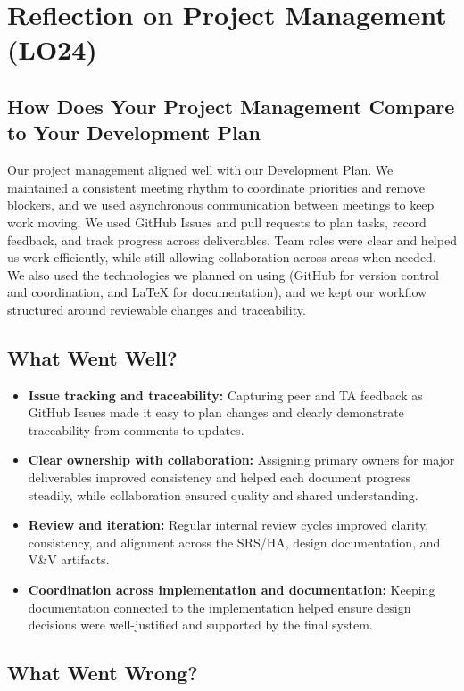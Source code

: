 \documentclass{article}
\begin{document}
\section{Reflection on Project Management (LO24)}

\subsection{How Does Your Project Management Compare to Your Development Plan}

Our project management aligned well with our Development Plan. We maintained a
consistent meeting rhythm to coordinate priorities and remove blockers, and we
used asynchronous communication between meetings to keep work moving. We used
GitHub Issues and pull requests to plan tasks, record feedback, and track progress
across deliverables. Team roles were clear and helped us work efficiently, while
still allowing collaboration across areas when needed. We also used the
technologies we planned on using (GitHub for version control and coordination,
and LaTeX for documentation), and we kept our workflow structured around
reviewable changes and traceability.

\subsection{What Went Well?}

\begin{itemize}
  \item \textbf{Issue tracking and traceability:} Capturing peer and TA feedback
  as GitHub Issues made it easy to plan changes and clearly demonstrate
  traceability from comments to updates.
  \item \textbf{Clear ownership with collaboration:} Assigning primary owners for
  major deliverables improved consistency and helped each document progress
  steadily, while collaboration ensured quality and shared understanding.
  \item \textbf{Review and iteration:} Regular internal review cycles improved
  clarity, consistency, and alignment across the SRS/HA, design documentation,
  and V\&V artifacts.
  \item \textbf{Coordination across implementation and documentation:} Keeping
  documentation connected to the implementation helped ensure design decisions
  were well-justified and supported by the final system.
\end{itemize}

\subsection{What Went Wrong?}
\end{document}

